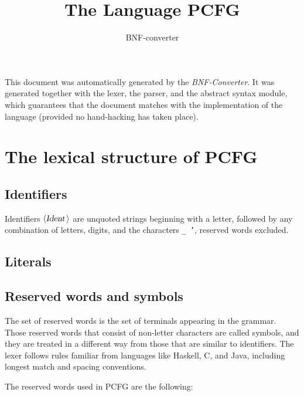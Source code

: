\documentclass[a4paper,11pt]{article}
\author{BNF-converter}
\title{The Language PCFG}
\begin{document}
\maketitle

\newcommand{\emptyP}{\mbox{$\epsilon$}}
\newcommand{\terminal}[1]{\mbox{{\texttt {#1}}}}
\newcommand{\nonterminal}[1]{\mbox{$\langle \mbox{{\sl #1 }} \! \rangle$}}
\newcommand{\arrow}{\mbox{::=}}
\newcommand{\delimit}{\mbox{$|$}}
\newcommand{\reserved}[1]{\mbox{{\texttt {#1}}}}
\newcommand{\literal}[1]{\mbox{{\texttt {#1}}}}
\newcommand{\symb}[1]{\mbox{{\texttt {#1}}}}

This document was automatically generated by the {\em BNF-Converter}. It was generated together with the lexer, the parser, and the abstract syntax module, which guarantees that the document matches with the implementation of the language (provided no hand-hacking has taken place).

\section*{The lexical structure of PCFG}
\subsection*{Identifiers}
Identifiers \nonterminal{Ident} are unquoted strings beginning with a letter,
followed by any combination of letters, digits, and the characters {\tt \_ '},
reserved words excluded.


\subsection*{Literals}






\subsection*{Reserved words and symbols}
The set of reserved words is the set of terminals appearing in the grammar. Those reserved words that consist of non-letter characters are called symbols, and they are treated in a different way from those that are similar to identifiers. The lexer follows rules familiar from languages like Haskell, C, and Java, including longest match and spacing conventions.

The reserved words used in PCFG are the following: \\
\end{document}
